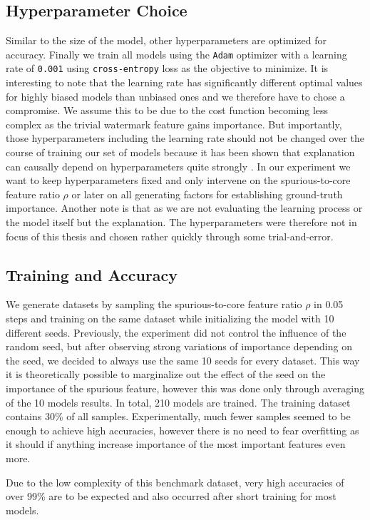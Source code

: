 \subsection{Hyperparameter Choice}
Similar to the size of the model, other hyperparameters are optimized for accuracy.
Finally we train all models using the \verb|Adam| optimizer  with a learning rate of \verb|0.001| using \verb|cross-entropy| loss  as the objective to minimize.
It is interesting to note that the learning rate has significantly different optimal values for highly biased models than unbiased ones and we therefore have to chose a compromise. We assume this to be due to the cost function becoming less complex as the trivial watermark feature gains importance.
But importantly, those hyperparameters including the learning rate should not be changed over the course of training our set of models because it has been shown that explanation can causally depend on hyperparameters quite strongly \cite{Karimi2023}. In our experiment we want to keep hyperparameters fixed and only intervene on the spurious-to-core feature ratio $\rho$ or later on all generating factors for establishing ground-truth importance. Another note is that as we are not evaluating the learning process or the model itself but the explanation. The hyperparameters were therefore not in focus of this thesis and chosen rather quickly through some trial-and-error.

\subsection{Training and Accuracy}
We generate datasets by sampling the spurious-to-core feature ratio $\rho$ in 0.05 steps and training on the same dataset while initializing the model with 10 different seeds.
Previously, the experiment did not control the influence of the random seed, but after observing strong variations of importance depending on the seed, we decided to always use the same 10 seeds for every dataset. This way it is theoretically possible to marginalize out the effect of the seed on the importance of the spurious feature, however this was done only through averaging of the 10 models results.
In total, 210 models are trained. The training dataset contains 30\% of all samples. Experimentally, much fewer samples seemed to be enough to achieve high accuracies, however there is no need to fear overfitting as it should if anything increase importance of the most important features even more.

Due to the low complexity of this benchmark dataset, very high accuracies of over 99\% are to be expected and also occurred after short training for most models.

